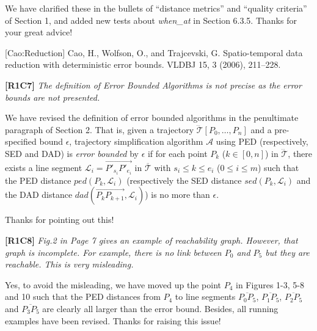 \documentclass{letter}
\newcommand{\kw}[1]{{\ensuremath {\mathsf{#1}}}\xspace}
\newcommand{\ie}{\emph{i.e.,}\xspace}
\newcommand{\vv}{\overrightarrow}
\begin{document}
We have clarified these in the bullets of ``distance metrics'' and ``quality criteria'' of Section 1, and added new tests about \emph{when\_at} in Section 6.3.5. Thanks for your great advice!


[Cao:Reduction] Cao, H., Wolfson, O., and Trajcevski, G. Spatio-temporal data reduction with deterministic error bounds. VLDBJ 15, 3 (2006), 211--228.




\textbf{[R1C7]} \emph{ The definition of Error Bounded Algorithms is not precise as the error bounds are not presented. }

We have revised the definition of error bounded algorithms in the penultimate paragraph of Section 2. That is, given a trajectory $\dddot{\mathcal{T}}\left[P_0, \dots, P_n\right]$ and a pre-specified bound $\epsilon$,
trajectory simplification algorithm $\mathcal{A}$ using PED (respectively, SED and DAD) is \emph{error bounded} by $\epsilon$ if for each point $P_k$ ($k\in[0,n]$) in $\dddot{\mathcal{T}}$, there exists a line segment $\mathcal{L}_i = \vv{P'_{s_i}P'_{e_i}}$ in $\overline{\mathcal{T}}$ with $s_i \le k \le e_i$ ($0\le i\le m$) such that the PED distance $ped\left(P_k, \mathcal{L}_i\right)$  (respectively the SED distance $sed\left(P_k, \mathcal{L}_i\right)$ and the DAD distance $dad\left(\vv{P_{k}P_{k+1}}, \mathcal{L}_i\right)$) is no more than  $\epsilon$.

Thanks for pointing out this!


\textbf{[R1C8]} \emph{ Fig.2 in Page 7 gives an example of reachability graph. However, that graph is incomplete. For example, there is no link between $P_0$ and $P_5$ but they are reachable. This is very misleading. }

Yes, to avoid the misleading, we have moved up the point $P_4$ in Figures 1-3, 5-8 and 10 such that the PED distances from $P_4$ to line segments $\overline{P_0P_5}$, $\overline{P_1P_5}$, $\overline{P_2P_5}$ and $\overline{P_3P_5}$ are clearly all larger than the error bound. Besides, all running examples have been revised.
Thanks for raising this issue!


\end{document}
